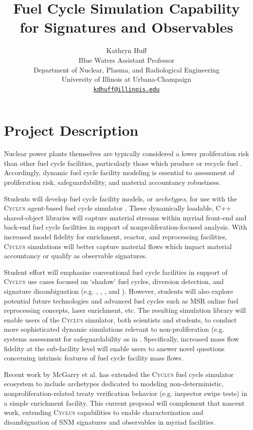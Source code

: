 \documentclass[11pt,letterpaper]{article}
\date{}
\author{Kathryn Huff\\
        Blue Waters Assistant Professor\\
        Department of Nuclear, Plasma, and Radiological Engineering\\
        University of Illinois at Urbana-Champaign\\
         \href{mailto:kdhuff@illinois.edu}{\texttt{kdhuff@illinois.edu}}}
\title{\vspace{-0.5in}Fuel Cycle Simulation Capability for Signatures and Observables}
\newcommand{\Cyclus}{\textsc{Cyclus}\xspace}%
\begin{document}
\maketitle
\section{Project Description}

Nuclear power plants themselves are typically considered a lower proliferation 
risk than other fuel cycle facilities, particularly those which produce or 
recycle fuel 
\cite{national_academy_of_sciences_americas_2009,national_research_council_proliferation_2012}. Accordingly, dynamic fuel cycle 
facility modeling is essential to assessment of proliferation risk, 
safeguardability, and material accountancy robustness. 

Students will develop fuel cycle facility models, or \emph{archetypes}, for use 
with the \Cyclus agent-based fuel cycle simulator \cite{huff_fundamental_2016}. 
These dynamically loadable, C++ shared-object libraries will 
capture material streams within myriad front-end and back-end fuel cycle 
facilities in support of nonproliferation-focused analysis.
With increased model fidelity for enrichment, reactor, and reprocessing 
facilities, \Cyclus simulations will better capture material flows which impact 
material accountancy or qualify as observable signatures.  


Student effort will emphasize conventional fuel cycle facilities in support of 
\Cyclus use cases focused on `shadow' fuel cycles, diversion detection, and 
signature disambiguation (e.g.  \cite{skutnik_assessment_2011}, \cite{boyer_developing_2014}, \cite{hou_diversion_2016} \cite{rossi_application_2015}, and \cite{yilmaz_online_2016}).  However, students will also explore potential 
future technologies and advanced fuel cycles such as \gls{MSR} online fuel 
reprocessing concepts, laser enrichment, etc.  The resulting simulation library 
will enable users of the \Cyclus simulator, both scientists and students, to 
conduct more sophisticated dynamic simulations relevant to non-proliferation 
(e.g.  systems assessment for safeguardability as in 
\cite{borrelli_approaches_2017}.  Specifically, increased mass flow fidelity at 
the sub-facility level will enable users to answer novel questions concerning 
intrinsic features of fuel cycle facility mass flows.  

Recent work by McGarry et al. \cite{mcgarry_mbmore_2017} has extended the 
\Cyclus fuel cycle simulator ecosystem to include 
archetypes dedicated to modeling non-deterministic, nonproliferation-related 
treaty verification behavior (e.g.  inspector swipe tests) in a simple 
enrichment facility. This current proposal will complement that nascent work, 
extending \Cyclus capabilities to enable characterization and disambiguation of 
\gls{SNM} signatures and observables in myriad facilities.
\end{document}
